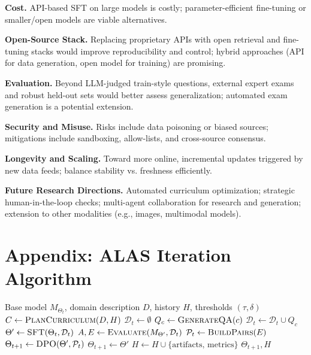 \documentclass[11pt]{article}
\begin{document}
\textbf{Cost.} API-based SFT on large models is costly; parameter-efficient fine-tuning or smaller/open models are viable alternatives.

\textbf{Open-Source Stack.} Replacing proprietary APIs with open retrieval and fine-tuning stacks would improve reproducibility and control; hybrid approaches (API for data generation, open model for training) are promising.

\textbf{Evaluation.} Beyond LLM-judged train-style questions, external expert exams and robust held-out sets would better assess generalization; automated exam generation is a potential extension.

\textbf{Security and Misuse.} Risks include data poisoning or biased sources; mitigations include sandboxing, allow-lists, and cross-source consensus.

\textbf{Longevity and Scaling.} Toward more online, incremental updates triggered by new data feeds; balance stability vs. freshness efficiently.

\textbf{Future Research Directions.} Automated curriculum optimization; strategic human-in-the-loop checks; multi-agent collaboration for research and generation; extension to other modalities (e.g., images, multimodal models).

\section{Appendix: ALAS Iteration Algorithm}
\begin{algorithm}[H]
\caption{ALAS Iteration}
\begin{algorithmic}[1]
\Require Base model $M_{\Theta_t}$, domain description $D$, history $H$, thresholds $(\tau,\delta)$
\State $C \gets \textsc{PlanCurriculum}(D,H)$
\State $\mathcal{D}_t \gets \emptyset$
  \State $Q_c \gets \textsc{GenerateQA}(c)$
  \State $\mathcal{D}_t \gets \mathcal{D}_t \cup Q_c$
\EndFor
\State $\Theta' \gets \textsc{SFT}(\Theta_t, \mathcal{D}_t)$
\State $A, E \gets \textsc{Evaluate}(M_{\Theta'}, \mathcal{D}_t)$ 
  \State $\mathcal{P}_t \gets \textsc{BuildPairs}(E)$
  \State $\Theta_{t+1} \gets \textsc{DPO}(\Theta', \mathcal{P}_t)$
\Else
  \State $\Theta_{t+1} \gets \Theta'$
\EndIf
\State $H \gets H \cup \{\text{artifacts, metrics}\}$
\State \Return $\Theta_{t+1}, H$
\end{algorithmic}
\end{algorithm}
\end{document}

